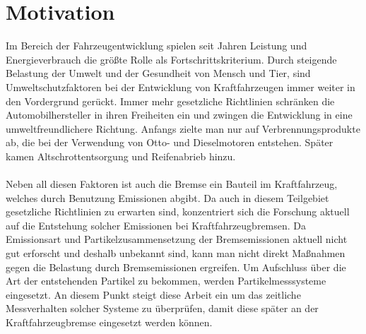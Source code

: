 \section{Motivation}
Im Bereich der Fahrzeugentwicklung spielen seit Jahren Leistung und Energieverbrauch die gr\"{o}{\ss}te Rolle als Fortschrittskriterium. Durch steigende Belastung der Umwelt und der Gesundheit von Mensch und Tier, sind Umweltschutzfaktoren bei der Entwicklung von Kraftfahrzeugen immer weiter in den Vordergrund ger\"{u}ckt. Immer mehr gesetzliche Richtlinien schr\"{a}nken die Automobilhersteller in ihren Freiheiten ein und zwingen die Entwicklung in eine umweltfreundlichere Richtung. Anfangs zielte man nur auf Verbrennungsprodukte ab, die bei der Verwendung von Otto- und Dieselmotoren entstehen. Sp\"{a}ter kamen Altschrottentsorgung und Reifenabrieb hinzu. 
\\\\
Neben all diesen Faktoren ist auch die Bremse ein Bauteil im Kraftfahrzeug, welches durch Benutzung Emissionen abgibt. Da auch in diesem Teilgebiet gesetzliche Richtlinien zu erwarten sind, konzentriert sich die Forschung aktuell auf die Entstehung solcher Emissionen bei Kraftfahrzeugbremsen. Da Emissionsart und Partikelzusammensetzung der Bremsemissionen aktuell nicht gut erforscht und deshalb unbekannt sind, kann man nicht direkt Ma{\ss}nahmen gegen die Belastung durch Bremsemissionen ergreifen. Um Aufschluss \"{u}ber die Art der entstehenden Partikel zu bekommen, werden Partikelmesssysteme eingesetzt. An diesem Punkt steigt diese Arbeit ein um das zeitliche Messverhalten solcher Systeme zu \"{u}berpr\"{u}fen, damit diese sp\"{a}ter an der Kraftfahrzeugbremse eingesetzt werden k\"{o}nnen.